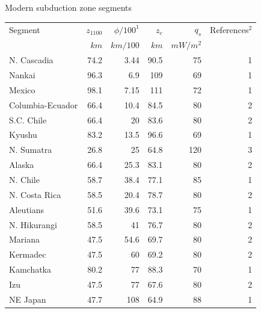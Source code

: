 \documentclass[draft]{assets/agujournal2019}
\begin{document}
\begin{threeparttable}
 \caption{Modern subduction zone segments}
 \label{Table4}
 \begin{tabularx}{\textwidth}{L{2} R{0.5} R{0.5} R{0.5} R{0.5} R{0.5}}

  \toprule

  Segment          & $z_{1100}$ & $\phi/100^1$ & $z_c$ & $q_s$    & References$^2$ \\

                   & $km$       & $km/100$     & $km$  & $mW/m^2$                  \\

  \midrule

  N. Cascadia      & 74.2       & 3.44         & 90.5  & 75       & 1              \\
  Nankai           & 96.3       & 6.9          & 109   & 69       & 1              \\
  Mexico           & 98.1       & 7.15         & 111   & 72       & 1
  \\
  Columbia-Ecuador & 66.4       & 10.4         & 84.5  & 80       & 2              \\
  S.C. Chile       & 66.4       & 20           & 83.6  & 80       & 2
  \\
  Kyushu           & 83.2       & 13.5         & 96.6  & 69       & 1
  \\
  N. Sumatra       & 26.8       & 25           & 64.8  & 120      & 3
  \\
  Alaska           & 66.4       & 25.3         & 83.1  & 80       & 2
  \\
  N. Chile         & 58.7       & 38.4         & 77.1  & 85       & 1
  \\
  N. Costa Rica    & 58.5       & 20.4         & 78.7  & 80       & 2
  \\
  Aleutians        & 51.6       & 39.6         & 73.1  & 75       & 1
  \\
  N. Hikurangi     & 58.5       & 41           & 76.7  & 80       & 2
  \\
  Mariana          & 47.5       & 54.6         & 69.7  & 80       & 2
  \\
  Kermadec         & 47.5       & 60           & 69.2  & 80       & 2
  \\
  Kamchatka        & 80.2       & 77           & 88.3  & 70       & 1
  \\
  Izu              & 47.5       & 77           & 67.6  & 80       & 2
  \\
  NE Japan         & 47.7       & 108          & 64.9  & 88       & 1
  \\


\end{tabularx}
\end{threeparttable}
\end{document}
